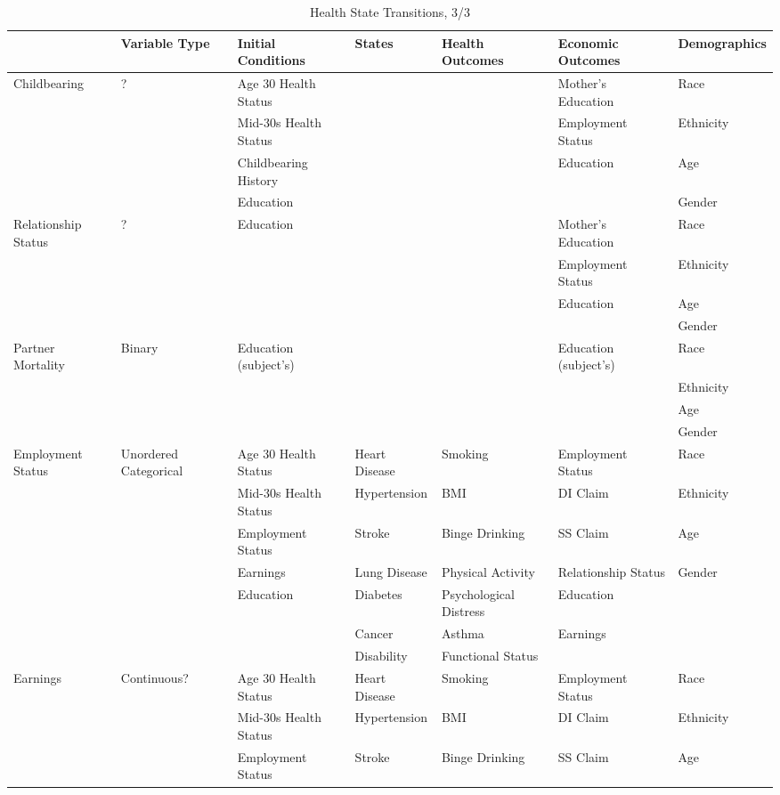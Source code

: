 \begin{table}
\caption{Health State Transitions, 3/3} \label{table:supertab3}
\begin{tiny}
\begin{tabular}{lllllll}
\toprule
 & Variable Type & Initial Conditions & States & Health Outcomes & Economic Outcomes & Demographics \\
\midrule		
Childbearing & ? & Age 30 Health Status & & & Mother's Education & Race \\
 &  & Mid-30s Health Status & & & Employment Status & Ethnicity \\
&  & Childbearing History& & & Education & Age \\
& & Education & & & & Gender \\
\midrule
Relationship Status & ? & Education & & & Mother's Education & Race \\
 & & & & & Employment Status & Ethnicity \\
& & & & & Education & Age \\
& & & & & & Gender \\
 \midrule		
Partner Mortality & Binary & Education (subject's) & & & Education (subject's) & Race \\
 & & & & &  & Ethnicity \\
& & & & & & Age \\
& & & & & & Gender \\
 \midrule
Employment Status & Unordered Categorical & Age 30 Health Status & Heart Disease & Smoking & Employment Status & Race \\
& & Mid-30s Health Status & Hypertension & BMI & DI Claim & Ethnicity \\
& & Employment Status & Stroke & Binge Drinking & SS Claim & Age \\
& & Earnings & Lung Disease &  Physical Activity & Relationship Status & Gender \\
& & Education & Diabetes & Psychological Distress & Education & \\
& & & Cancer & Asthma & Earnings & \\
& & & Disability & Functional Status & & \\
 \midrule
Earnings & Continuous? & Age 30 Health Status & Heart Disease & Smoking & Employment Status & Race \\
& & Mid-30s Health Status & Hypertension & BMI & DI Claim & Ethnicity \\
& & Employment Status & Stroke & Binge Drinking & SS Claim & Age \\

\end{tabular}
\end{tiny}
\end{table}
